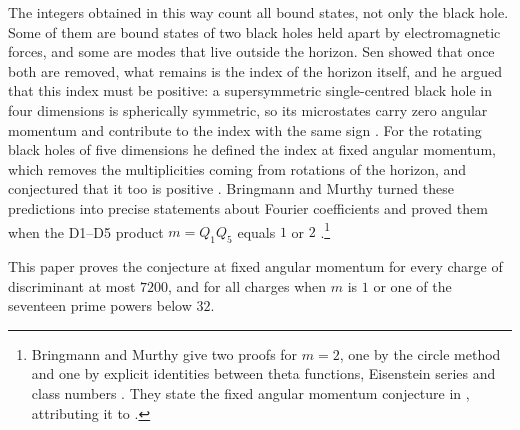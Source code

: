\documentclass[11pt]{amsart}
\theoremstyle{definition}
\begin{document}
The integers obtained in this way count all bound states, not only the black hole. Some of them are bound states of two black holes held apart by electromagnetic forces, and some are modes that live outside the horizon. Sen showed that once both are removed, what remains is the index of the horizon itself, and he argued that this index must be positive: a supersymmetric single-centred black hole in four dimensions is spherically symmetric, so its microstates carry zero angular momentum and contribute to the index with the same sign \cite{Sen11,DGMS11}. For the rotating black holes of five dimensions he defined the index at fixed angular momentum, which removes the multiplicities coming from rotations of the horizon, and conjectured that it too is positive \cite{Sen12}. Bringmann and Murthy turned these predictions into precise statements about Fourier coefficients and proved them when the D1--D5 product $m=Q_1Q_5$ equals $1$ or $2$ \cite{BM13}.\footnote{Bringmann and Murthy give two proofs for $m=2$, one by the circle method and one by explicit identities between theta functions, Eisenstein series and class numbers \cite[\S\S4--6]{BM13}. They state the fixed angular momentum conjecture in \cite[\S2.3]{BM13}, attributing it to \cite{Sen12}.}

This paper proves the conjecture at fixed angular momentum for every charge of discriminant at most $7200$, and for all charges when $m$ is $1$ or one of the seventeen prime powers below $32$.\enlargethispage{6pt}
\end{document}
